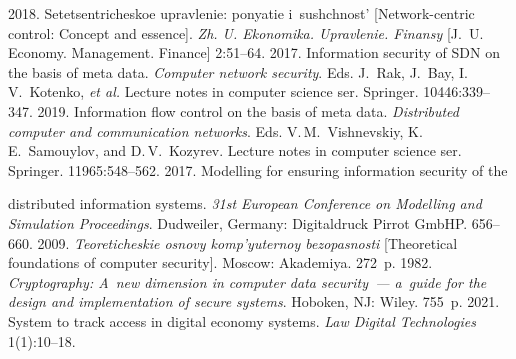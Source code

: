 




\vspace*{4pt}

  \begin{multicols}{2}

\renewcommand{\bibname}{\protect\rmfamily References}

{\small\frenchspacing
 {%
 \begin{thebibliography}{9}
 
 \vspace*{-4pt}
 
 2018. Setetsentricheskoe 
upravlenie: ponyatie i~sushchnost' [Network-centric control: Concept and essence]. \textit{Zh. 
U. Ekonomika. Upravlenie. Finansy} [J.~U. Economy. Management. Finance]  
2:51--64.
 2017. Information 
security of SDN on the basis of meta data. \textit{Computer network security}. Eds. J.~Rak, J.~Bay, 
I.\,V.~Kotenko, \textit{et al.} Lecture notes in computer science ser. Springer. 10446:339--347.
 2019. Information flow control on the 
basis of meta data. \textit{Distributed computer and communication networks}. Eds. V.\,M.~Vishnevskiy, K.\,E.~Samouylov, and 
D.\,V.~Kozyrev. Lecture notes in computer science ser. Springer. 11965:548--562.
 2017. Modelling for ensuring 
information security of the\linebreak\vspace*{-12pt}

\pagebreak

\noindent
 distributed information systems. \textit{31st European Conference on 
Modelling and Simulation Proceedings}. Dudweiler, Germany: Digitaldruck Pirrot GmbHP. 656--660. 
 2009. \textit{Teoreticheskie osnovy 
komp'yuternoy bezopasnosti} [Theoretical foundations of computer security]. Moscow: Akademiya. 
272~p.
 1982. \textit{Cryptography: A~new dimension in computer 
data security~--- a~guide for the design and implementation of secure systems}. Hoboken, NJ: Wiley. 
755~p.
  2021. System to track access in digital economy 
systems. \textit{Law  Digital Technologies} 1(1):10--18.
\end{thebibliography}

 }
 }

\end{multicols}

